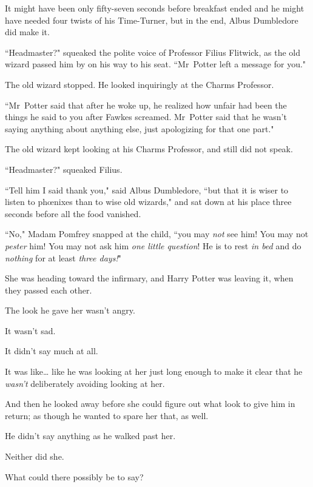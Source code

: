 
It might have been only fifty-seven seconds before breakfast ended and he might have needed four twists of his Time-Turner, but in the end, Albus Dumbledore did make it.

``Headmaster?" squeaked the polite voice of Professor Filius Flitwick, as the old wizard passed him by on his way to his seat. ``Mr~Potter left a message for you."

The old wizard stopped. He looked inquiringly at the Charms Professor.

``Mr~Potter said that after he woke up, he realized how unfair had been the things he said to you after Fawkes screamed. Mr~Potter said that he wasn't saying anything about anything else, just apologizing for that one part."

The old wizard kept looking at his Charms Professor, and still did not speak.

``Headmaster?" squeaked Filius.

``Tell him I said thank you," said Albus Dumbledore, ``but that it is wiser to listen to phœnixes than to wise old wizards," and sat down at his place three seconds before all the food vanished.


``No," Madam Pomfrey snapped at the child, ``you may \emph{not} see him! You may not \emph{pester} him! You may not ask him \emph{one little question}! He is to rest \emph{in bed} and do \emph{nothing} for at least \emph{three days!}"


She was heading toward the infirmary, and Harry Potter was leaving it, when they passed each other.

The look he gave her wasn't angry.

It wasn't sad.

It didn't say much at all.

It was like{\ldots} like he was looking at her just long enough to make it clear that he \emph{wasn't} deliberately avoiding looking at her.

And then he looked away before she could figure out what look to give him in return; as though he wanted to spare her that, as well.

He didn't say anything as he walked past her.

Neither did she.

What could there possibly be to say?

